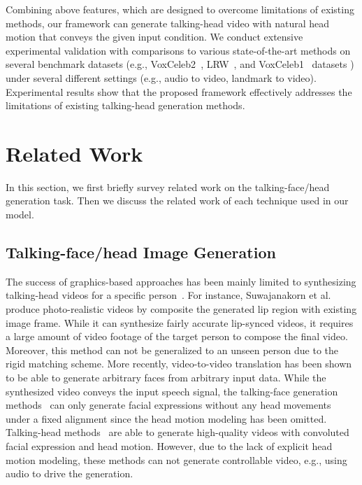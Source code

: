 \documentclass[runningheads]{llncs}
\begin{document}
Combining above features, which are designed to overcome limitations of existing methods, our framework can generate talking-head video with natural head motion that conveys the given input condition. We conduct extensive experimental validation with comparisons to various state-of-the-art methods on several benchmark datasets (e.g., VoxCeleb2~\cite{Chung18b}, LRW~\cite{Chung16}, and VoxCeleb1~\cite{Nagrani17} datasets ) under several different settings (e.g., audio to video, landmark to video). Experimental results show that the proposed framework effectively addresses the limitations of existing talking-head generation methods.

\section{Related Work}
\label{sec:related}
In this section, we first briefly survey related work on the talking-face/head generation task. Then we discuss the related work of each technique used in our model.

\subsection{Talking-face/head Image Generation}
\label{subsec:talking-syn}
The success of graphics-based approaches has been mainly limited to synthesizing talking-head videos for a specific person~\cite{garrido2015vdub,bregler1997video,chang2005transferable,liu2011realistic,suwajanakorn2017synthesizing}. For instance, Suwajanakorn et al.~\cite{suwajanakorn2017synthesizing} produce photo-realistic videos by composite the generated lip region with existing image frame. While it can synthesize fairly accurate lip-synced videos, it requires a large amount of video footage of the target person to compose the final video. Moreover, this method can not be generalized to an unseen person due to the rigid matching scheme. More recently, video-to-video translation has been shown to be able to generate arbitrary faces from arbitrary input data. While the synthesized video conveys the input speech signal, the talking-face generation methods~\cite{chung2017you,zhou2019talking,ijcai2019-129,vougioukas2019realistic,chen2019hierarchical} can only generate facial expressions without any head movements under a fixed alignment since the head motion modeling has been omitted. Talking-head methods~\cite{zakharov2019few,wang2018fewshotvid2vid,wiles2018x2face} are able to generate high-quality videos with convoluted facial expression and head motion. However, due to the lack of explicit head motion modeling, these methods can not generate controllable video, e.g., using audio to drive the generation. 
\end{document}
